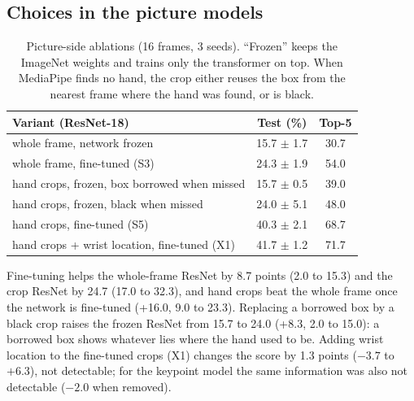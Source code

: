 \documentclass{article}
\begin{document}
\subsection{Choices in the picture models}
\begin{table}[t]
\centering\small\setlength{\tabcolsep}{3pt}
\begin{tabular}{lcc}
\toprule
Variant (ResNet-18) & Test (\%) & Top-5 \\
\midrule
whole frame, network frozen                       & 15.7 $\pm$ 1.7 & 30.7 \\
whole frame, fine-tuned (S3)                      & 24.3 $\pm$ 1.9 & 54.0 \\
hand crops, frozen, box borrowed when missed      & 15.7 $\pm$ 0.5 & 39.0 \\
hand crops, frozen, black when missed             & 24.0 $\pm$ 5.1 & 48.0 \\
hand crops, fine-tuned (S5)                        & 40.3 $\pm$ 2.1 & 68.7 \\
hand crops + wrist location, fine-tuned (X1)       & 41.7 $\pm$ 1.2 & 71.7 \\
\bottomrule
\end{tabular}
\caption{Picture-side ablations (16 frames, 3 seeds). ``Frozen'' keeps the ImageNet weights and trains only the
transformer on top. When MediaPipe finds no hand, the crop either reuses the box from the nearest frame where the hand
was found, or is black.}
\label{tab:pix-abl}
\end{table}

Fine-tuning helps the whole-frame ResNet by 8.7 points (2.0 to 15.3) and the crop ResNet by 24.7 (17.0 to 32.3), and
hand crops beat the whole frame once the network is fine-tuned (+16.0, 9.0 to 23.3). Replacing a borrowed box by a black
crop raises the frozen ResNet from 15.7 to 24.0 (+8.3, 2.0 to 15.0): a borrowed box shows whatever lies where the hand
used to be. Adding wrist location to the fine-tuned crops (X1) changes the score by 1.3 points ($-3.7$ to $+6.3$), not detectable;
for the keypoint model the same information was also not detectable ($-2.0$ when removed).
\end{document}
